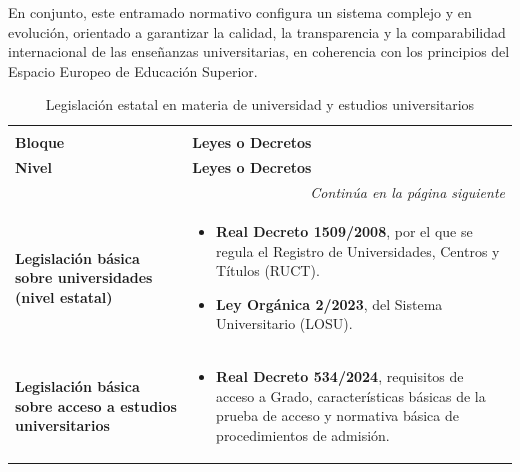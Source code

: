 \documentclass[
  11pt,
  a4paper,
  twoside]{scrreprt}
\begin{document}
En conjunto, este entramado normativo configura un sistema complejo y en
evolución, orientado a garantizar la calidad, la transparencia y la
comparabilidad internacional de las enseñanzas universitarias, en
coherencia con los principios del Espacio Europeo de Educación Superior.

\begin{longtable}{p{5cm} p{10cm}}

\caption{\label{tbl-legislacion-estatal-universidad}Legislación estatal
en materia de universidad y estudios universitarios}

\tabularnewline

\rowcolors{2}{lightgray}{white}
 \\
\toprule
\label{tbl-legislacion-estatal-universidad} \\

\hline
\textbf{Bloque} & \textbf{Leyes o Decretos}  \\
\hline
\endfirsthead

\hline
\textbf{Nivel} & \textbf{Leyes o Decretos} \\
\hline
\endhead

\hline
\multicolumn{2}{r}{\textit{Continúa en la página siguiente}} \\
\endfoot

\hline
\endlastfoot

\textbf{Legislación básica sobre universidades (nivel estatal)} &
\begin{itemize}
\item \textbf{Real Decreto 1509/2008}, por el que se regula el Registro de Universidades, Centros y Títulos (RUCT).
\item \textbf{Ley Orgánica 2/2023}, del Sistema Universitario (LOSU).
\end{itemize}
\\ \hline

\textbf{Legislación básica sobre acceso a estudios universitarios} &
\begin{itemize}
\item \textbf{Real Decreto 534/2024}, requisitos de acceso a Grado, características básicas de la prueba de acceso y normativa básica de procedimientos de admisión.
\end{itemize}
\\ \hline


\end{longtable}
\end{document}

